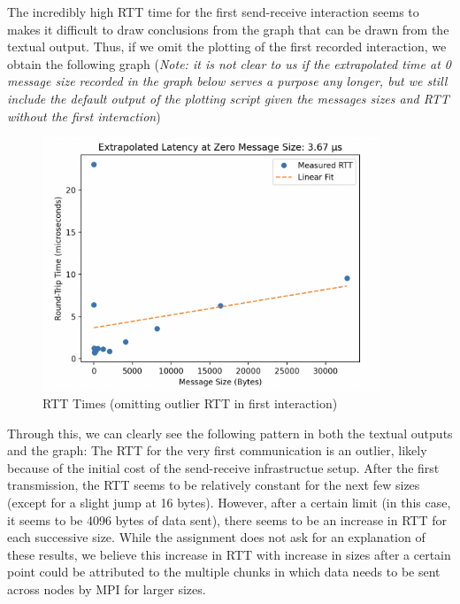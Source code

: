 \documentclass[a4paper,10pt]{article}
\begin{document}
The incredibly high RTT time for the first send-receive interaction seems to makes it difficult to draw conclusions from the graph that can be drawn from the textual output. Thus, if we omit the plotting of the first recorded interaction, we obtain the following graph (\textit{Note: it is not clear to us if the extrapolated time at 0 message size recorded in the graph below serves a purpose any longer, but we still include the default output of the plotting script given the messages sizes and RTT without the first interaction})

  \begin{figure}[H]
    \centering
    \includegraphics[width=0.9\textwidth]{img/bonus_large_pattern}
    \caption{RTT Times (omitting outlier RTT in first interaction)}
    \label{fig:bonus_rtt_pattern}
  \end{figure}


Through this, we can clearly see the following pattern in both the textual outputs and the graph: The RTT for the very first communication is an outlier, likely because of the initial cost of the send-receive infrastructue setup. After the first transmission, the RTT seems to be relatively constant for the next few sizes (except for a slight jump at 16 bytes). However, after a certain limit (in this case, it seems to be 4096 bytes of data sent), there seems to be an increase in RTT for each successive size. While the assignment does not ask for an explanation of these results, we believe this increase in RTT with increase in sizes after a certain point could be attributed to the multiple chunks in which data needs to be sent across nodes by MPI for larger sizes. 




\end{document}

